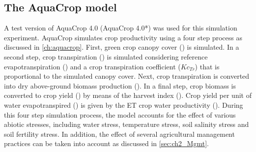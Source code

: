 \subsection{The AquaCrop model}
A test version of AquaCrop 4.0 (AquaCrop 4.0*) was used for this simulation experiment. AquaCrop simulates crop productivity using a four step process as discussed in \autoref{ch:aquacrop}. First, green crop canopy cover (\CC) is simulated. In a second step, crop transpiration (\Tr) is simulated considering reference evapotranspiration (\ETo) and a crop transpiration coefficient ($Kc_{Tr}$) that is proportional to the simulated canopy cover. Next, crop transpiration is converted into dry above-ground biomass production (\B). In a final step, crop biomass is converted to crop yield (\Y) by means of the harvest index (\HI). Crop yield per unit of water evapotranspired (\ET) is given by the ET crop water productivity (\WPET). During this four step simulation process, the model accounts for the effect of various abiotic stresses, including water stress, temperature stress, soil salinity stress and soil fertility stress. In addition, the effect of several agricultural management practices can be taken into account as discussed in \autoref{sec:ch2_Mgmt}. 

